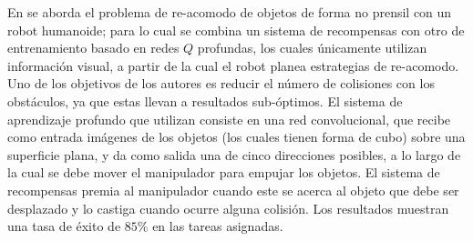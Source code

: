 En \cite{8462863} se aborda el problema de re-acomodo de objetos de forma no prensil con un robot humanoide; para lo cual se combina un sistema de recompensas con otro de entrenamiento basado en redes $Q$ profundas, los cuales únicamente utilizan información visual, a partir de la cual el robot planea estrategias de re-acomodo. 
Uno de los objetivos de los autores es reducir el número de colisiones con los obstáculos, ya que estas llevan a resultados sub-óptimos.
El sistema de aprendizaje profundo que utilizan consiste en una red convolucional, que recibe como entrada imágenes de los objetos (los cuales tienen forma de cubo) sobre una superficie plana, y da como salida una de cinco direcciones posibles, a lo largo de la cual se debe mover el manipulador para empujar los objetos.
El sistema de recompensas premia al manipulador cuando este se acerca al objeto que debe ser desplazado y lo castiga cuando ocurre alguna colisión.
Los resultados muestran una tasa de éxito de $85\%$ en las tareas asignadas.

